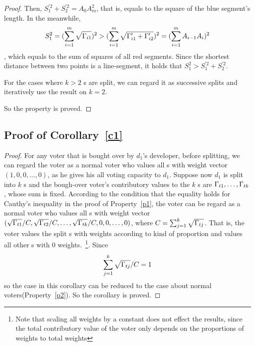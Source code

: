 \begin{proof}
   	Then, $S_1^{'2}+S_2^{'2}=A_0A_m^2$, that is, equals to the square of the blue segment's length. In the meanwhile,
   	 $$S_1^2 = (\sum_{i=1}^m \sqrt{\Gamma_{i1}})^2 > (\sum_{i=1}^m \sqrt{\Gamma'_{i1}+\Gamma'_{i2}})^2 = (\sum_{i=1}^m A_{i-1}A_i)^2$$,
   	 which equals to the sum of squares of all red segments. Since the shortest distance between two points is a line-segment, it holds that $S_1^2 >S_1^{'2}+S_2^{'2}$.

   	 For the cases where $k>2$ {\dapp}s are split, 	we can regard it as successive splits and iteratively use the result on $k=2$.

   	 So the property is proved.

\end{proof}

\subsection{Proof of Corollary~\ref{c1}}
\label{subsection:proof3}
\begin{proof}
	For any voter that is bought over by $d_1$'s developer, before splitting, we
	can regard the voter as a normal voter who values all {\dapp}s with weight
	vector $(1,0,0,\ldots,0)$, as he gives his all voting capacity to $d_1$.
	Suppose now $d_1$ is split into $k$ {\dapp}s and the bough-over voter's
	contributory values to the $k$ {\dapp}s are $\Gamma_{t1},\ldots,\Gamma_{tk}$, whose
	sum is fixed. According to the condition that the equality holds for Cauthy's
	inequality in the proof of Property~\ref{p1}, the voter can be regard as a
	normal voter who values all {\dapp}s with weight vector
	$(\sqrt{\Gamma_{t1}}/C,\sqrt{\Gamma_{t2}}/C,\ldots, \sqrt{\Gamma_{tk}}/C,0,0,\ldots,0)$, where $C=\sum_{j=1}^k \sqrt{\Gamma_{tj}}$. That is, the voter values the split {\dapp}s with weights according to kind of proportion and values all other {\dapp}s with 0 weights.~\footnote{Note that scaling all weights by a constant does not effect the results, since the total contributory value of the voter only depends on the proportions of weights to total weights}. Since
		$$\sum_{j=1}^k \sqrt{\Gamma_{tj}}/C =1$$
	so the case in this corollary can be reduced to the case about normal voters(Property~\ref{p2}). So the corollary is proved.
\end{proof}

